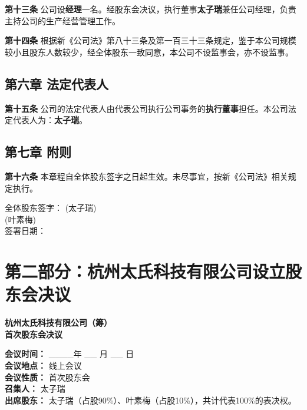 \documentclass[a4paper, 12pt]{ctexart}
\begin{document}
\textbf{第十三条} 公司设\textbf{经理}一名。经股东会决议，执行董事\textbf{太子瑞}兼任公司经理，负责主持公司的生产经营管理工作。

\textbf{第十四条} 根据新《公司法》第八十三条及第一百三十三条规定，鉴于本公司规模较小且股东人数较少，经全体股东一致同意，本公司不设监事会，亦不设监事。

\subsection*{第六章 法定代表人}
\textbf{第十五条} 公司的法定代表人由代表公司执行公司事务的\textbf{执行董事}担任。本公司法定代表人为：\textbf{太子瑞}。

\subsection*{第七章 附则}
\textbf{第十六条} 本章程自全体股东签字之日起生效。未尽事宜，按新《公司法》相关规定执行。

\vspace{1cm}
\begin{flushright}
全体股东签字：\underline{\hspace{4cm}} (太子瑞) \\
\vspace{0.5cm}
\underline{\hspace{4cm}} (叶素梅) \\
\vspace{0.5cm}
签署日期：\underline{\hspace{4cm}}
\end{flushright}

\newpage
\section{第二部分：杭州太氏科技有限公司设立股东会决议}

\begin{center}
\Large \textbf{杭州太氏科技有限公司（筹）} \\
\vspace{0.3cm}
\Large \textbf{首次股东会决议}
\end{center}

\vspace{1cm}

\noindent \textbf{会议时间：} \_\_\_\_年 \_\_ 月 \_\_ 日 \\
\textbf{会议地点：} 线上会议 \\
\textbf{会议性质：} 首次股东会 \\
\textbf{召集人：} 太子瑞 \\
\textbf{出席股东：} 太子瑞（占股90\%）、叶素梅（占股10\%），共计代表100\%的表决权。
\end{document}
